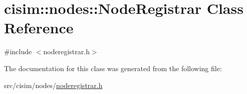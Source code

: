 \hypertarget{classcisim_1_1nodes_1_1_node_registrar}{}\section{cisim\+:\+:nodes\+:\+:Node\+Registrar Class Reference}
\label{classcisim_1_1nodes_1_1_node_registrar}


{\ttfamily \#include $<$noderegistrar.\+h$>$}



The documentation for this class was generated from the following file\+:\begin{DoxyCompactItemize}
\item 
src/cisim/nodes/\hyperlink{noderegistrar_8h}{noderegistrar.\+h}\end{DoxyCompactItemize}
